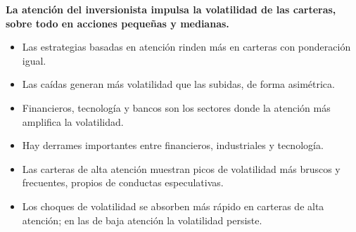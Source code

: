 \documentclass{article}
\newcommand{\bodysize}{\fontsize{29}{38.3}\selectfont}
\newcommand{\cardtitlesize}{\fontsize{34.2}{41.0}\selectfont}
\newcommand{\smallsize}{\fontsize{23.8}{30.9}\selectfont}
\newcommand{\cardtitle}[2][navy]{{\color{#1}\cardtitlesize\bfseries\textls[110]{\MakeUppercase{#2}}}\par\vspace{7mm}}
\begin{document}
\vfill
\hspace*{34mm}\begin{minipage}{773mm}
\begin{tcolorbox}[card=teal]\cardtitle[teal]{Resultados}
\begin{tcolorbox}[enhanced, sharp corners, colback=tealSoft, boxrule=0pt, left=14mm, right=14mm, top=10mm, bottom=11mm,
  borderline west={4mm}{0mm}{teal}, fontupper=\bodysize\color{ink}\raggedright]
{\color{teal}\smallsize\bfseries{}}\par\vspace{4mm}
{\bfseries La atención del inversionista impulsa la volatilidad de las carteras, sobre todo en acciones pequeñas y medianas.}
\end{tcolorbox}
\vspace{11mm}
\begin{minipage}[t]{0.48\linewidth}
\begin{itemize}
\item Las estrategias basadas en atención rinden más en carteras con ponderación igual.
\item Las caídas generan más volatilidad que las subidas, de forma asimétrica.
\item Financieros, tecnología y bancos son los sectores donde la atención más amplifica la volatilidad.
\end{itemize}
\end{minipage}\hfill
\begin{minipage}[t]{0.48\linewidth}
\begin{itemize}
\item Hay derrames importantes entre financieros, industriales y tecnología.
\item Las carteras de alta atención muestran picos de volatilidad más bruscos y frecuentes, propios de conductas especulativas.
\item Los choques de volatilidad se absorben más rápido en carteras de alta atención; en las de baja atención la volatilidad persiste.
\end{itemize}
\end{minipage}
\end{tcolorbox}
\end{minipage}
\end{document}
